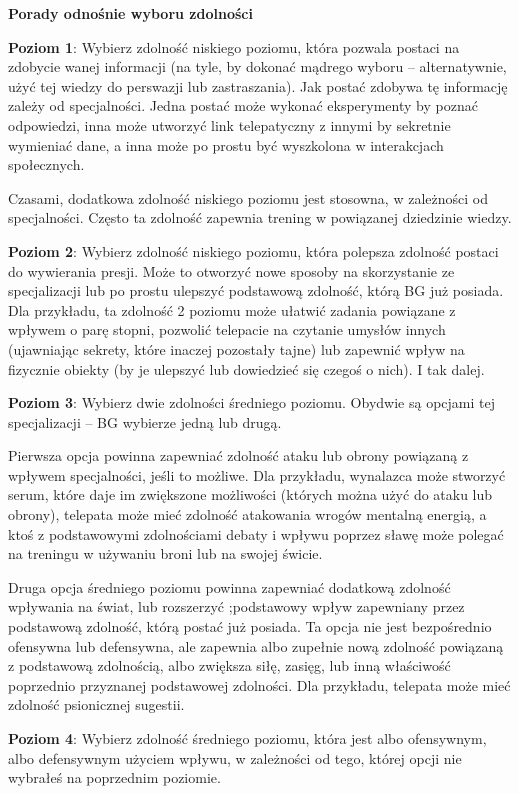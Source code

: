 \textbf{Porady odnośnie wyboru zdolności}

\textbf{Poziom 1}: Wybierz zdolność niskiego poziomu, która pozwala postaci na zdobycie wanej informacji (na tyle, by dokonać mądrego wyboru – alternatywnie, użyć tej wiedzy do perswazji lub zastraszania). Jak postać zdobywa tę informację zależy od specjalności. Jedna postać może wykonać eksperymenty by poznać odpowiedzi, inna może utworzyć link telepatyczny z innymi by sekretnie wymieniać dane, a inna może po prostu być wyszkolona w interakcjach społecznych. 

Czasami, dodatkowa zdolność niskiego poziomu jest stosowna, w zależności od specjalności. Często ta zdolność zapewnia trening w powiązanej dziedzinie wiedzy.

\textbf{Poziom 2}: Wybierz zdolność niskiego poziomu, która polepsza zdolność postaci do wywierania presji. Może to otworzyć nowe sposoby na skorzystanie ze specjalizacji lub po prostu ulepszyć podstawową zdolność, którą BG już posiada. Dla przykładu, ta zdolność 2 poziomu może ułatwić zadania powiązane z wpływem o parę stopni, pozwolić telepacie na czytanie umysłów innych (ujawniając sekrety, które inaczej pozostały tajne) lub zapewnić wpływ na fizycznie obiekty (by je ulepszyć lub dowiedzieć się czegoś o nich). I tak dalej.

\textbf{Poziom 3}: Wybierz dwie zdolności średniego poziomu. Obydwie są opcjami tej specjalizacji – BG wybierze jedną lub drugą.

Pierwsza opcja powinna zapewniać zdolność ataku lub obrony powiązaną z wpływem specjalności, jeśli to możliwe. Dla przykładu, wynalazca może stworzyć serum, które daje im zwiększone możliwości (których można użyć do ataku lub obrony), telepata może mieć zdolność atakowania wrogów mentalną energią, a ktoś z podstawowymi zdolnościami debaty i wpływu poprzez sławę może polegać na treningu w używaniu broni lub na swojej świcie.

Druga opcja średniego poziomu powinna zapewniać dodatkową zdolność wpływania na świat, lub rozszerzyć ;podstawowy wpływ zapewniany przez podstawową zdolność, którą postać już posiada. Ta opcja nie jest bezpośrednio ofensywna lub defensywna, ale zapewnia albo zupełnie nową zdolność powiązaną z podstawową zdolnością, albo zwiększa siłę, zasięg, lub inną właściwość poprzednio przyznanej podstawowej zdolności. Dla przykładu, telepata może mieć zdolność psionicznej sugestii.

\textbf{Poziom 4}: Wybierz zdolność średniego poziomu, która jest albo ofensywnym, albo defensywnym użyciem wpływu, w zależności od tego, której opcji nie wybrałeś na poprzednim poziomie.


